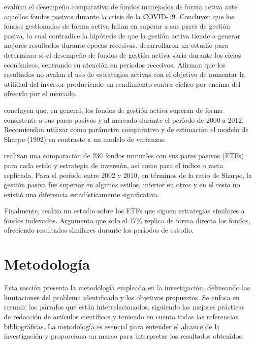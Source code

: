 \documentclass[a4paper,fleqn]{cas-sc}
\begin{document}
\cite{Pastor} evalúan el desempeño comparativo de fondos manejados de forma activa ante aquellos fondos pasivos durante la crisis de la COVID-19. Concluyen que los fondos gestionados de forma activa fallan en superar a sus pares de gestión pasiva, lo cual contradice la hipótesis de que la gestión activa tiende a generar mejores resultados durante épocas recesivas. \cite{Souza} desarrollaron un estudio para determinar si el desempeño de fondos de gestión activa varía durante los ciclos económicos, centrando su atención en periodos recesivos. Afirman que los resultados no avalan el uso de estrategias activas con el objetivo de aumentar la utilidad del inversor produciendo un rendimiento contra cíclico por encima del ofrecido por el mercado.

\cite{Gerakos} concluyen que, en general, los fondos de gestión activa superan de forma consistente a sus pares pasivos y al mercado durante el período de 2000 a 2012. Recomiendan utilizar como parámetro comparativo y de estimación el modelo de Sharpe (1992) en contraste a un modelo de varianzas.

\cite{Sharifzadeh} realizan una comparación de 230 fondos mutuales con sus pares pasivos (ETFs) para cada estilo y estrategia de inversión, así como para el índice o meta replicada. Para el período entre 2002 y 2010, en términos de la ratio de Sharpe, la gestión pasiva fue superior en algunos estilos, inferior en otros y en el resto no existió una diferencia estadísticamente significativa.

Finalmente, \cite{Svetina} realiza un estudio sobre los ETFs que siguen estrategias similares a fondos indexados. Argumenta que solo el 17\% replica de forma directa los fondos, ofreciendo resultados similares durante los períodos de estudio.

\section{Metodología}
Esta sección presenta la metodología empleada en la investigación, delineando las limitaciones del problema identificado y los objetivos propuestos. Se enfoca en resumir los párrafos que están interrelacionados, siguiendo las mejores prácticas de redacción de artículos científicos y teniendo en cuenta todas las referencias bibliográficas. La metodología es esencial para entender el alcance de la investigación y proporciona un marco para interpretar los resultados obtenidos.
\end{document}
